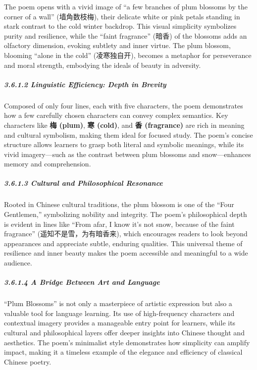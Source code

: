 \documentclass[
  11pt,
  letterpaper,
]{article}
\begin{document}
The poem opens with a vivid image of ``a few branches of plum blossoms
by the corner of a wall'' (墙角数枝梅), their delicate white or pink
petals standing in stark contrast to the cold winter backdrop. This
visual simplicity symbolizes purity and resilience, while the ``faint
fragrance'' (暗香) of the blossoms adds an olfactory dimension, evoking
subtlety and inner virtue. The plum blossom, blooming ``alone in the
cold'' (凌寒独自开), becomes a metaphor for perseverance and moral
strength, embodying the ideals of beauty in adversity.

\hypertarget{linguistic-efficiency-depth-in-brevity}{%
\subparagraph{3.6.1.2 Linguistic Efficiency: Depth in
Brevity}\label{linguistic-efficiency-depth-in-brevity}}

Composed of only four lines, each with five characters, the poem
demonstrates how a few carefully chosen characters can convey complex
semantics. Key characters like \textbf{梅 (plum)}, \textbf{寒 (cold)},
and \textbf{香 (fragrance)} are rich in meaning and cultural symbolism,
making them ideal for focused study. The poem's concise structure allows
learners to grasp both literal and symbolic meanings, while its vivid
imagery---such as the contrast between plum blossoms and snow---enhances
memory and comprehension.

\hypertarget{cultural-and-philosophical-resonance}{%
\subparagraph{3.6.1.3 Cultural and Philosophical
Resonance}\label{cultural-and-philosophical-resonance}}

Rooted in Chinese cultural traditions, the plum blossom is one of the
``Four Gentlemen,'' symbolizing nobility and integrity. The poem's
philosophical depth is evident in lines like ``From afar, I know it's
not snow, because of the faint fragrance'' (遥知不是雪，为有暗香来),
which encourages readers to look beyond appearances and appreciate
subtle, enduring qualities. This universal theme of resilience and inner
beauty makes the poem accessible and meaningful to a wide audience.

\hypertarget{a-bridge-between-art-and-language}{%
\subparagraph{3.6.1.4 A Bridge Between Art and
Language}\label{a-bridge-between-art-and-language}}

``Plum Blossoms'' is not only a masterpiece of artistic expression but
also a valuable tool for language learning. Its use of high-frequency
characters and contextual imagery provides a manageable entry point for
learners, while its cultural and philosophical layers offer deeper
insights into Chinese thought and aesthetics. The poem's minimalist
style demonstrates how simplicity can amplify impact, making it a
timeless example of the elegance and efficiency of classical Chinese
poetry.
\end{document}
